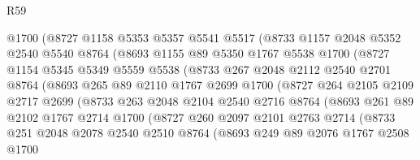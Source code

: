 \begin{lexlean}{R59}
\begin{coremodule}
              @1700
              (@8727
                @1158
                @5353
                @5357
                @5541
                @5517
                (@8733
                  @1157
                  @2048
                  @5352
                  @2540
                  @5540
                  @8764
                  (@8693
                    @1155
                    @89
                    @5350
                    @1767
                    @5538
                    @1700
                    (@8727
                      @1154
                      @5345
                      @5349
                      @5559
                      @5538
                      (@8733
                        @267
                        @2048
                        @2112
                        @2540
                        @2701
                        @8764
                        (@8693
                          @265
                          @89
                          @2110
                          @1767
                          @2699
                          @1700
                          (@8727
                            @264
                            @2105
                            @2109
                            @2717
                            @2699
                            (@8733
                              @263
                              @2048
                              @2104
                              @2540
                              @2716
                              @8764
                              (@8693
                                @261
                                @89
                                @2102
                                @1767
                                @2714
                                @1700
                                (@8727
                                  @260
                                  @2097
                                  @2101
                                  @2763
                                  @2714
                                  (@8733
                                    @251
                                    @2048
                                    @2078
                                    @2540
                                    @2510
                                    @8764
                                    (@8693
                                      @249
                                      @89
                                      @2076
                                      @1767
                                      @2508
                                      @1700

\end{coremodule}
\end{lexlean}
